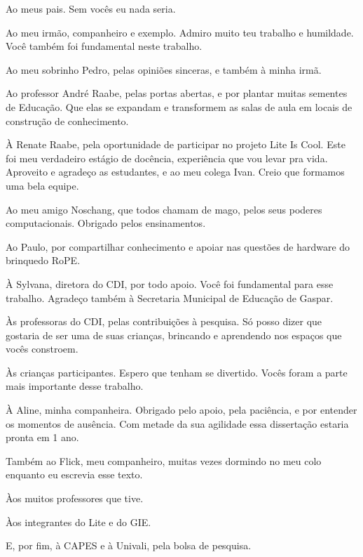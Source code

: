 \begin{agradecimentos}

    Ao meus pais. Sem vocês eu nada seria. 

    Ao meu irmão, companheiro e exemplo. Admiro muito teu trabalho e humildade. Você também foi fundamental neste trabalho. 

    Ao meu sobrinho Pedro, pelas opiniões sinceras, e também à minha irmã.

    Ao professor André Raabe, pelas portas abertas, e por plantar muitas sementes de Educação. Que elas se expandam e transformem as salas de aula em locais de construção de conhecimento.

    À Renate Raabe, pela oportunidade de participar no projeto Lite Is Cool. Este foi meu verdadeiro estágio de docência, experiência que vou levar pra vida. Aproveito e agradeço as estudantes, e ao meu colega Ivan. Creio que formamos uma bela equipe.

    Ao meu amigo Noschang, que todos chamam de mago, pelos seus poderes computacionais. Obrigado pelos ensinamentos.

    Ao Paulo, por compartilhar conhecimento e apoiar nas questões de hardware do brinquedo RoPE.

    À Sylvana, diretora do CDI, por todo apoio. Você foi fundamental para esse trabalho. Agradeço também à Secretaria Municipal de Educação de Gaspar. 

    Às professoras do CDI, pelas contribuições à pesquisa. Só posso dizer que gostaria de ser uma de suas crianças, brincando e aprendendo nos espaços que vocês constroem.
    
    Às crianças participantes. Espero que tenham se divertido. Vocês foram a parte mais importante desse trabalho.

    À Aline, minha companheira. Obrigado pelo apoio, pela paciência, e por entender os momentos de ausência. Com metade da sua agilidade essa dissertação estaria pronta em 1 ano.

    Também ao Flick, meu companheiro, muitas vezes dormindo no meu colo enquanto eu escrevia esse texto.

    Àos muitos professores que tive.

    Àos integrantes do Lite e do GIE.

    E, por fim, à CAPES e à Univali, pela bolsa de pesquisa. 

\end{agradecimentos}